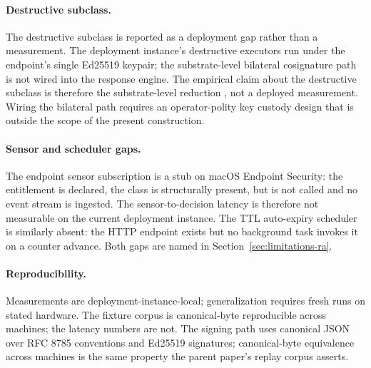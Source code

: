\paragraph{Destructive subclass.}
The destructive subclass is reported as a deployment gap rather than
a measurement. The deployment instance's destructive executors run
under the endpoint's single Ed25519 keypair; the substrate-level
bilateral cosignature path is not wired into the response engine. The
empirical claim about the destructive subclass is therefore the
substrate-level reduction
, not a deployed
measurement. Wiring the bilateral path requires an operator-polity
key custody design that is outside the scope of the present
construction.

\paragraph{Sensor and scheduler gaps.}
The endpoint sensor subscription is a stub on macOS Endpoint Security:
the entitlement is declared, the class is structurally present, but
 is not called and no event stream is
ingested. The sensor-to-decision latency is therefore not measurable
on the current deployment instance. The TTL auto-expiry scheduler is
similarly absent: the  HTTP endpoint exists but no
background task invokes it on a counter advance. Both gaps are named
in Section~\ref{sec:limitations-ra}.

\paragraph{Reproducibility.}
Measurements are deployment-instance-local; generalization requires
fresh runs on stated hardware. The fixture corpus is canonical-byte
reproducible across machines; the latency numbers are not. The signing
path uses canonical JSON over RFC 8785 conventions and Ed25519
signatures; canonical-byte equivalence across machines is the same
property the parent paper's replay corpus asserts.
